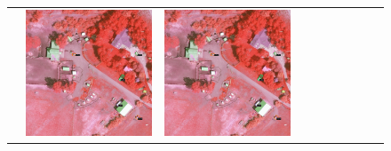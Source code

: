 \begin{figure}[H]
\begin{tabularx}{\textwidth}{c|*{9}{X}}
    & \includegraphics[trim={730pt 220pt 200pt 720pt},clip,width=\linewidth]{images/015Results/02perm_exp/comp_images/rirb/523.png}
    & \includegraphics[trim={850pt 110pt 80pt 830pt},clip,width=\linewidth]{images/015Results/02perm_exp/comp_images/rirb/523.png}

\end{tabularx}
\end{figure}

